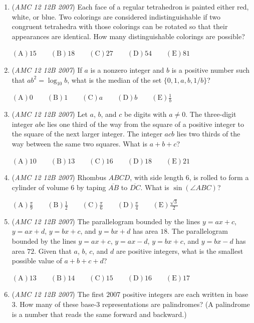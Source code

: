 \begin{enumerate}
	\item (\textit{AMC 12 12B 2007}) Each face of a regular tetrahedron is painted either red, white, or blue. Two colorings are considered indistinguishable if two congruent tetrahedra with those colorings can be rotated so that their appearances are identical. How many distinguishable colorings are possible?


 $\mathrm {(A)} 15\qquad \mathrm {(B)} 18\qquad \mathrm {(C)} 27\qquad \mathrm {(D)} 54\qquad \mathrm {(E)} 81$


	\item (\textit{AMC 12 12B 2007}) If $a$ is a nonzero integer and $b$ is a positive number such that $ab^2=\log_{10}b$, what is the median of the set $\{0,1,a,b,1/b\}$?


 $\mathrm {(A)} 0\qquad \mathrm {(B)} 1\qquad \mathrm {(C)} a\qquad \mathrm {(D)} b\qquad \mathrm {(E)} \frac{1}{b}$


	\item (\textit{AMC 12 12B 2007}) Let $a$, $b$, and $c$ be digits with $a\ne 0$. The three-digit integer $abc$ lies one third of the way from the square of a positive integer to the square of the next larger integer. The integer $acb$ lies two thirds of the way between the same two squares. What is $a+b+c$?


 $\mathrm {(A)} 10\qquad \mathrm {(B)} 13\qquad \mathrm {(C)} 16\qquad \mathrm {(D)} 18\qquad \mathrm {(E)} 21$


	\item (\textit{AMC 12 12B 2007}) Rhombus $ABCD$, with side length $6$, is rolled to form a cylinder of volume $6$ by taping $\overline{AB}$ to $\overline{DC}$. What is $\sin(\angle ABC)$?


 $\mathrm {(A)} \frac{\pi}{9}\qquad \mathrm {(B)} \frac{1}{2}\qquad \mathrm {(C)} \frac{\pi}{6}\qquad \mathrm {(D)} \frac{\pi}{4}\qquad \mathrm {(E)} \frac{\sqrt{3}}{2}$


	\item (\textit{AMC 12 12B 2007}) The parallelogram bounded by the lines $y=ax+c$, $y=ax+d$, $y=bx+c$, and $y=bx+d$ has area $18$. The parallelogram bounded by the lines $y=ax+c$, $y=ax-d$, $y=bx+c$, and $y=bx-d$ has area $72$. Given that $a$, $b$, $c$, and $d$ are positive integers, what is the smallest possible value of $a+b+c+d$?


 $\mathrm {(A)} 13\qquad \mathrm {(B)} 14\qquad \mathrm {(C)} 15\qquad \mathrm {(D)} 16\qquad \mathrm {(E)} 17$


	\item (\textit{AMC 12 12B 2007}) The first $2007$ positive integers are each written in base $3$. How many of these base-$3$ representations are palindromes? (A palindrome is a number that reads the same forward and backward.)



\end{enumerate}
